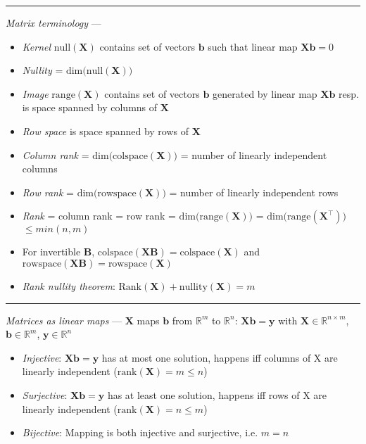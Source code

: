 {\color{lightgray}\hrule height 0.001mm}

\emph{Matrix terminology} ---
\begin{itemize}
    \item \emph{Kernel} $\textrm{null}(\boldsymbol{X})$ contains set of vectors $\boldsymbol{b}$ such that linear map $\boldsymbol{X}\boldsymbol{b} = 0$
    \item \emph{Nullity} = $\textrm{dim(null}(\boldsymbol{X}))$
    \item \emph{Image} $\textrm{range}(\boldsymbol{X})$ contains set of vectors $\boldsymbol{b}$ generated by linear map $\boldsymbol{X}\boldsymbol{b}$ resp. is space spanned by columns of $\boldsymbol{X}$
    \item \emph{Row space} is space spanned by rows of $\boldsymbol{X}$ 
    \item \emph{Column rank} = $\textrm{dim(colspace}(\boldsymbol{X}))$ = number of linearly independent columns
    \item \emph{Row rank} = $\textrm{dim(rowspace}(\boldsymbol{X}))$ = number of linearly independent rows
    \item \emph{Rank} = column rank = row rank = $\textrm{dim(range}(\boldsymbol{X}))$ = $\textrm{dim(range}(\boldsymbol{X}^\intercal))$ $\leq min(n,m)$
    \item For invertible $\boldsymbol{B}$, $\textrm{colspace}(\boldsymbol{X}\boldsymbol{B}) = \textrm{colspace}(\boldsymbol{X})$ and $\textrm{rowspace}(\boldsymbol{X}\boldsymbol{B}) = \textrm{rowspace}(\boldsymbol{X})$
    \item \emph{Rank nullity theorem}: $\textrm{Rank}(\boldsymbol{X}) + \textrm{nullity}(\boldsymbol{X}) = m$
\end{itemize}

{\color{lightgray}\hrule height 0.001mm}

\emph{Matrices as linear maps} ---
$\boldsymbol{X}$ maps $\boldsymbol{b}$ from $\mathbb{R}^m$ to $\mathbb{R}^n$: $\boldsymbol{X}\boldsymbol{b} = \boldsymbol{y}$ with $\boldsymbol{X} \in \mathbb{R}^{n \times m}$, $\boldsymbol{b} \in \mathbb{R}^{m}$, $\boldsymbol{y} \in \mathbb{R}^{n}$
\begin{itemize}
    \item \emph{Injective}: $\boldsymbol{X}\boldsymbol{b} = \boldsymbol{y}$ has at most one solution, happens iff columns of X are linearly independent ($\textrm{rank}(\boldsymbol{X}) = m \leq n$)
    \item \emph{Surjective}: $\boldsymbol{X}\boldsymbol{b} = \boldsymbol{y}$ has at least one solution, happens iff rows of X are linearly independent ($\textrm{rank}(\boldsymbol{X}) = n \leq m$)
    \item \emph{Bijective}: Mapping is both injective and surjective, i.e. $m=n$
\end{itemize}

